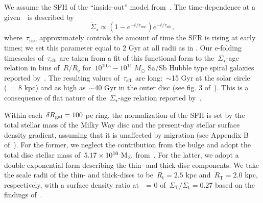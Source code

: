 \documentclass[ms.tex]{subfiles}
\begin{document}
\par
We assume the SFH of the ``inside-out'' model from~\citet{Johnson2021}.
The time-dependence at a given~\rgal~is described by
\begin{equation}
\dot{\Sigma}_\star \propto (1 - e^{-t / \tau_\text{rise}})
e^{-t/\tau_\text{sfh}},
\end{equation}
where~$\tau_\text{rise}$ approximately controls the amount of time the SFR is
rising at early times; we set this parameter equal to 2 Gyr at all radii as in
\citet{Johnson2021}.
Our e-folding timescales of~$\tau_\text{sfh}$ are taken from a fit of this
functional form to the~$\Sigma_\star$-age relation in bins of~$R / R_\text{e}$
for~$10^{10.5} - 10^{11}~M_\odot$ Sa/Sb Hubble type spiral galaxies reported
by~\citet{Sanchez2020}.
The resulting values of~$\tau_\text{sfh}$ are long:~$\sim$15 Gyr at the solar
circle (\rgal~= 8 kpc) and as high as~$\sim$40 Gyr in the outer disc (see fig.
3 of~\citealp{Johnson2021}).
This is a consequence of flat nature of the~$\Sigma_\star$-age relation
reported by~\citet{Sanchez2020}.
\par
Within each~$\delta R_\text{gal} = 100$ pc ring, the normalization of the SFH is set by
the total stellar mass of the Milky Way disc and the present-day stellar
surface density gradient, assuming that it is unaffected by migration (see
Appendix B of~\citealp{Johnson2021}).
For the former, we neglect the contribution from the bulge and adopt the total
disc stellar mass of~$5.17\times10^{10}~\text{M}_\odot$ from~\citet{Licquia2015}.
For the latter, we adopt a double exponential form describing the thin- and
thick-disc components.
We take the scale radii of the thin- and thick-discs to be~$R_\text{t} = 2.5$
kpc and~$R_\text{T} = 2.0$ kpc, respectively, with a surface density ratio
at~\rgal~= 0 of~$\Sigma_\text{T} / \Sigma_\text{t} = 0.27$ based on the
findings of~\citet{Bland-Hawthorn2016}.
\end{document}

